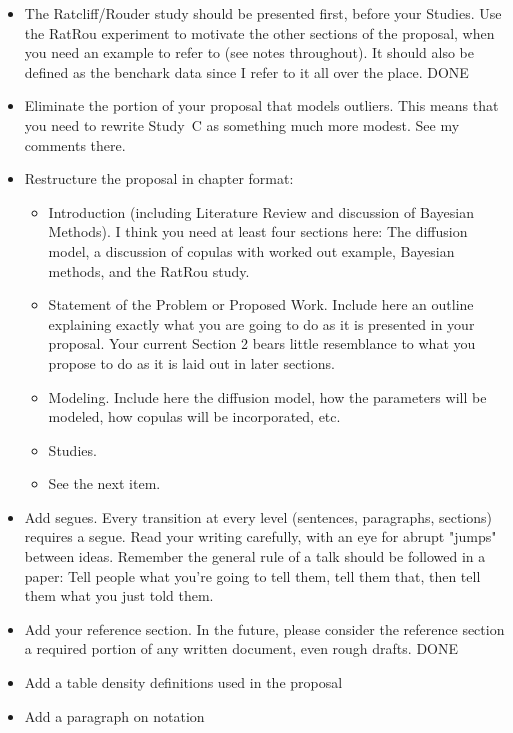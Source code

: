\documentclass[12pt]{article}
\begin{document}
\begin{itemize}
\item The Ratcliff/Rouder study should be presented first, before your
      Studies.  Use the RatRou experiment to motivate the other
      sections of the proposal, when you need an example to refer to
      (see notes throughout). It should also be defined as the benchark data since I refer to it all over the place.
      DONE
\item Eliminate the portion of your proposal that models outliers.
      This means that you need to rewrite Study~C as something much more
      modest.  See my comments there.
\item Restructure the proposal in chapter format: 
\begin{itemize}
      \item Introduction (including Literature Review and discussion
      of Bayesian Methods).  I think you need at least four sections
      here: The diffusion model, a discussion of copulas with worked
      out example, Bayesian methods, and the RatRou study.
      \item Statement of the Problem or Proposed Work.  Include here
      an outline explaining exactly what you are going to do as it is
      presented in your proposal.  Your current Section 2 bears little
      resemblance to what you propose to do as it is laid out in later
      sections.
      \item Modeling.  Include here the diffusion model, how the
      parameters will be modeled, how copulas will be incorporated,
      etc.
      \item Studies.
      \item See the next item.
\end{itemize}
\item Add segues.  Every transition at every level (sentences,
      paragraphs, sections) requires a segue.  Read your writing
      carefully, with an eye for abrupt "jumps" between ideas.
      Remember the general rule of a talk should be followed in a
      paper: Tell people what you're going to tell them, tell them
      that, then tell them what you just told them. 
\item Add your reference section.  In the future, please consider the
      reference section a required portion of any written document, even
      rough drafts. DONE
\item Add a table density definitions used in the proposal
\item Add a paragraph on notation
\end{itemize}
\end{document}
